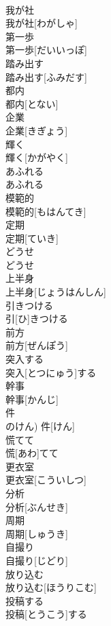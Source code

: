 \documentclass[8pt]{extreport}
\begin{document}
\begin{CJK}{UTF8}{min}
\\	我が社	
\\	我が社[わがしゃ]	
\\	第一歩	
\\	第一歩[だいいっぽ]	
\\	踏み出す	
\\	踏み出す[ふみだす]	
\\	都内	
\\	都内[とない]	
\\	企業	
\\	企業[きぎょう]	
\\	輝く	
\\	輝く[かがやく]	
\\	あふれる	
\\	あふれる	
\\	模範的	
\\	模範的[もはんてき]	
\\	定期	
\\	定期[ていき]	
\\	どうせ	
\\	どうせ	
\\	上半身	
\\	上半身[じょうはんしん]	
\\	引きつける	
\\	引[ひ]きつける	
\\	前方	
\\	前方[ぜんぽう]	
\\	突入する	
\\	突入[とつにゅう]する	
\\	幹事	
\\	幹事[かんじ]	
\\	件	
\\	のけん)	件[けん]	
\\	慌てて	
\\	慌[あわ]てて	
\\	更衣室	
\\	更衣室[こういしつ]	
\\	分析	
\\	分析[ぶんせき]	
\\	周期	
\\	周期[しゅうき]	
\\	自撮り	
\\	自撮り[じどり]	
\\	放り込む	
\\	放り込む[ほうりこむ]	
\\	投稿する	
\\	投稿[とうこう]する	

\end{CJK}
\end{document}
